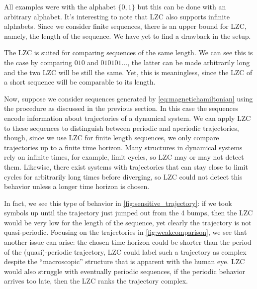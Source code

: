 All examples were with the alphabet $\{0,1\}$ but this can be done with an arbitrary alphabet. It's interesting to note that LZC also supports infinite alphabets. Since we consider finite sequences, there is an upper bound for LZC, namely, the length of the sequence. We have yet to find a drawback in the setup.

The LZC is suited for comparing sequences of the same length. We can see this is the case by comparing $010$ and $010101\dots$, the latter can be made arbitrarily long and the two LZC will be still the same. Yet, this is meaningless, since the LZC of a short sequence will be comparable to its length.

Now, suppose we consider sequences generated by \eqref{eq:magnetichamiltonian} using the procedure as discussed in the previous section. In this case the sequences encode information about trajectories of a dynamical system. We can apply LZC to these sequences to distinguish between periodic and aperiodic trajectories, though, since we use LZC for finite length sequences, we only compare trajectories up to a finite time horizon. Many structures in dynamical systems rely on infinite times, for example, limit cycles, so LZC may or may not detect them. Likewise, there exist systems with trajectories that can stay close to limit cycles for arbitrarily long times before diverging, so LZC could not detect this behavior unless a longer time horizon is chosen. 

In fact, we see this type of behavior in \cref{fig:sensitive_trajectory}: if we took symbols up until the trajectory just jumped out from the 4 bumps, then the LZC would be very low for the length of the sequence, yet clearly the trajectory is not quasi-periodic. Focusing on the trajectories in \cref{fig:weakcomparison}, we see that another issue can arise: the chosen time horizon could be shorter than the period of the (quasi)-periodic trajectory, LZC could label such a trajectory as complex despite the ``macroscopic'' structure that is apparent with the human eye. LZC would also struggle with eventually periodic sequences, if the periodic behavior arrives too late, then the LZC ranks the trajectory complex.